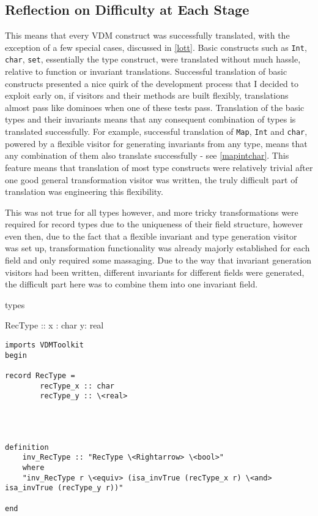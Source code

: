 \subsection{Reflection on Difficulty at Each Stage}
This means that every VDM construct was successfully translated, with the exception of a few special cases, discussed in \ref{lott}. Basic constructs such as \lstinline[language=Isabelle]{Int}, \lstinline[language=Isabelle]{char}, \lstinline[language=Isabelle]{set}, essentially the type construct, were translated without much hassle, relative to function or invariant translations. Successful translation of basic constructs presented a nice quirk of the development process that I decided to exploit early on, if visitors and their methods are built flexibly, translations almost pass like dominoes when one of these tests pass. Translation of the basic types and their invariants means that any consequent combination of types is translated successfully. For example, successful translation of \lstinline[language=Isabelle]{Map}, \lstinline[language=Isabelle]{Int} and \lstinline[language=Isabelle]{char}, powered by a flexible visitor for generating invariants from any type, means that any combination of them also translate successfully - see \ref{mapintchar}. This feature means that translation of most type constructs were relatively trivial after one good general transformation visitor was written, the truly difficult part of translation was engineering this flexibility. 

This was not true for all types however, and more tricky transformations were required for record types due to the uniqueness of their field structure, however even then, due to the fact that a flexible invariant and type generation visitor was set up, transformation functionality was already majorly established for each field and only required some massaging. Due to the way that invariant generation visitors had been written, different invariants for different fields were generated, the difficult part here was to combine them into one invariant field.


\begin{vdmsl}[caption=Rec2FieldsDiffTypes.vdmsl\, two fields needed to have invariant checks in the invariant but were generated in separate invariant functions.]
types

RecType :: x : char
           y: real
\end{vdmsl}

\begin{lstlisting}[language=Isabelle, caption=After removing malformed individual invariants from the AST\, one was generated and combined\, no additional code had to be written to translate each field's type as this had already been done when translating type constructs.]
  imports VDMToolkit
begin

record RecType =
        recType_x :: char
        recType_y :: \<real>
    



definition
	inv_RecType :: "RecType \<Rightarrow> \<bool>"
    where
    "inv_RecType r \<equiv> (isa_invTrue (recType_x r) \<and> isa_invTrue (recType_y r))"

end
\end{lstlisting}

